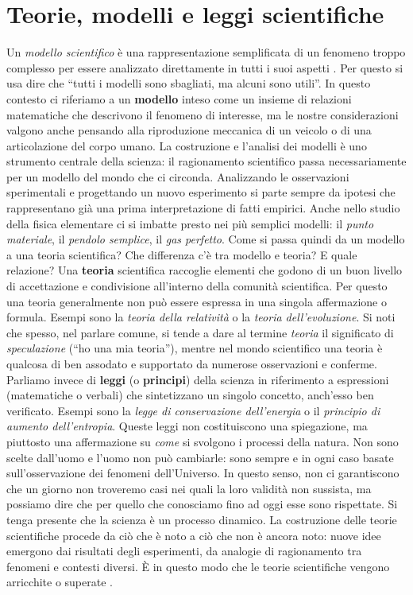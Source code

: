 \section*{Teorie, modelli e leggi scientifiche}
Un \emph{modello scientifico} è una rappresentazione semplificata di un fenomeno
troppo complesso per essere analizzato direttamente in tutti i suoi aspetti \cite{bndl}. Per questo 
si usa dire che ``tutti i modelli sono sbagliati, ma alcuni sono utili''. 
In questo contesto ci riferiamo a un \textbf{modello} inteso come un insieme di relazioni 
matematiche che descrivono il fenomeno di interesse, ma le nostre considerazioni valgono anche
pensando alla riproduzione meccanica di un veicolo o di una articolazione 
del corpo umano.
La costruzione e l'analisi dei modelli è uno strumento centrale della scienza: il ragionamento
scientifico passa necessariamente per un modello del mondo che ci circonda. Analizzando
le osservazioni sperimentali e progettando un nuovo esperimento si parte sempre da ipotesi 
che rappresentano già una prima interpretazione di fatti empirici.
Anche nello studio della fisica elementare ci si imbatte presto nei più semplici modelli:
il \emph{punto materiale}, il \emph{pendolo semplice}, il \emph{gas perfetto}. Come si passa quindi da un modello
a una teoria scientifica? Che differenza c'è tra modello e teoria? E quale relazione?
Una \textbf{teoria} scientifica raccoglie elementi che godono di un buon livello di accettazione e 
condivisione all'interno della comunità scientifica. Per questo una teoria generalmente non
può essere espressa in una singola affermazione o formula. Esempi sono la \emph{teoria della relatività}
o la \emph{teoria dell'evoluzione}.
Si noti che spesso, nel parlare comune, si tende a dare al termine \emph{teoria} il significato
di \emph{speculazione} (``ho una mia teoria''), mentre nel mondo scientifico una teoria è qualcosa
di ben assodato e supportato da numerose osservazioni e conferme.
Parliamo invece di \textbf{leggi} (o \textbf{principi}) della scienza in riferimento a 
espressioni (matematiche o verbali) che sintetizzano un singolo concetto, anch'esso ben verificato.
Esempi sono la \emph{legge di conservazione dell'energia} o il \emph{principio di aumento dell'entropia}.
Queste leggi non costituiscono una spiegazione, ma piuttosto una affermazione su \textsl{come} si
svolgono i processi della natura. Non sono scelte dall'uomo e l'uomo non può cambiarle: sono
sempre e in ogni caso basate sull'osservazione dei fenomeni dell'Universo. In questo senso,
non ci garantiscono che un giorno non troveremo casi nei quali la loro validità non sussista,
ma possiamo dire che per quello che conosciamo fino ad oggi esse sono rispettate.
Si tenga presente che la scienza è un processo dinamico. La costruzione delle teorie scientifiche
procede da ciò che è noto a ciò che non è ancora noto:
nuove idee emergono dai risultati degli esperimenti, da analogie di ragionamento tra
fenomeni e contesti diversi. È in questo modo che le teorie scientifiche vengono arricchite o 
superate \cite{hrtm}.

